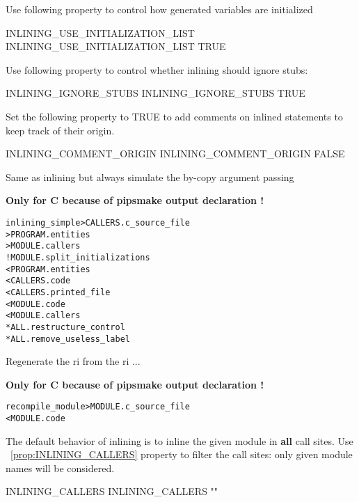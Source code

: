 \documentclass[a4paper]{report}
\newenvironment{PipsMake}{\begin{alltt}}{\end{alltt}}
\newcommand{\PipsPropRef}[1]{\texttt{\detokenize{#1}}~\ref{prop:#1}}
\newenvironment{PipsPass}[1]{\label{pass:#1}}{}
\begin{document}
Use following property to control how generated variables are initialized
\begin{PipsProp}{INLINING_USE_INITIALIZATION_LIST}
INLINING_USE_INITIALIZATION_LIST TRUE
\end{PipsProp}

Use following property to control whether inlining should ignore stubs:
\begin{PipsProp}{INLINING_IGNORE_STUBS}
INLINING_IGNORE_STUBS TRUE
\end{PipsProp}


Set the following property to TRUE to add comments on inlined statements to
keep track of their origin.
\begin{PipsProp}{INLINING_COMMENT_ORIGIN}
INLINING_COMMENT_ORIGIN FALSE
\end{PipsProp}

\begin{PipsPass}{inlining_simple}
Same as inlining but always simulate the by-copy argument passing
\end{PipsPass}

\textbf{Only for C because of pipsmake output declaration !}
\begin{PipsMake}
inlining_simple      > CALLERS.c_source_file
                     > PROGRAM.entities
                     > MODULE.callers
		! MODULE.split_initializations
        < PROGRAM.entities
        < CALLERS.code
        < CALLERS.printed_file
		< MODULE.code
        < MODULE.callers
        * ALL.restructure_control
		* ALL.remove_useless_label
\end{PipsMake}

\begin{PipsPass}{recompile_module}
Regenerate the ri from the ri ...
\end{PipsPass}

\textbf{Only for C because of pipsmake output declaration !}
\begin{PipsMake}
recompile_module > MODULE.c_source_file
	< MODULE.code
\end{PipsMake}


The default behavior of inlining is to inline the given module in \textbf{all} call sites.
Use \PipsPropRef{INLINING_CALLERS} property to filter the call sites: only given module names will be considered.
\begin{PipsProp}{INLINING_CALLERS}
INLINING_CALLERS ""
\end{PipsProp}
\end{document}
